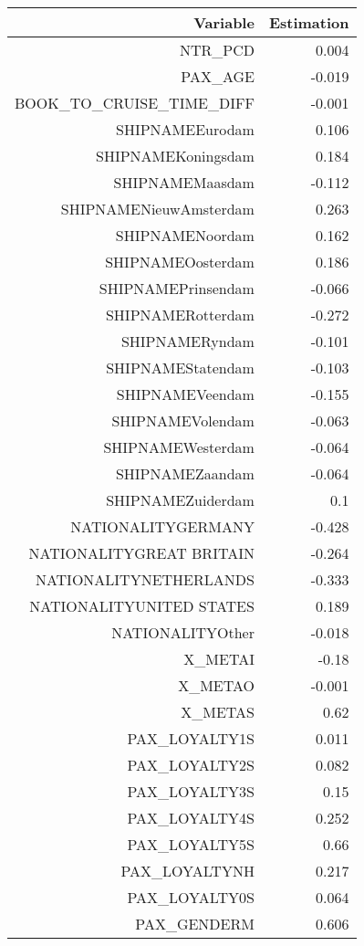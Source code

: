 \documentclass{article}
\begin{document}
\begin{table}[H]\centering
	\begin{tabular}{rr}
		Variable & Estimation \\
		\hline 
		\hline 
		NTR\_PCD & 0.004 \\
		PAX\_AGE & -0.019 \\
		BOOK\_TO\_CRUISE\_TIME\_DIFF & -0.001 \\
		SHIPNAMEEurodam & 0.106 \\
		SHIPNAMEKoningsdam & 0.184 \\
		SHIPNAMEMaasdam & -0.112 \\
		SHIPNAMENieuwAmsterdam & 0.263 \\
		SHIPNAMENoordam & 0.162 \\
		SHIPNAMEOosterdam & 0.186 \\
		SHIPNAMEPrinsendam & -0.066 \\
		SHIPNAMERotterdam & -0.272 \\
		SHIPNAMERyndam & -0.101 \\
		SHIPNAMEStatendam & -0.103 \\
		SHIPNAMEVeendam & -0.155 \\
		SHIPNAMEVolendam & -0.063 \\
		SHIPNAMEWesterdam & -0.064 \\
		SHIPNAMEZaandam & -0.064 \\
		SHIPNAMEZuiderdam & 0.1 \\
		NATIONALITYGERMANY  & -0.428 \\
		NATIONALITYGREAT BRITAIN & -0.264 \\
		NATIONALITYNETHERLANDS & -0.333 \\
		NATIONALITYUNITED STATES & 0.189 \\
		NATIONALITYOther & -0.018 \\
		X\_METAI & -0.18 \\
		X\_METAO & -0.001 \\
		X\_METAS & 0.62 \\
		PAX\_LOYALTY1S & 0.011 \\
		PAX\_LOYALTY2S & 0.082 \\
		PAX\_LOYALTY3S & 0.15 \\
		PAX\_LOYALTY4S & 0.252 \\
		PAX\_LOYALTY5S & 0.66 \\
		PAX\_LOYALTYNH & 0.217 \\
		PAX\_LOYALTY0S & 0.064 \\
		PAX\_GENDERM & 0.606 \\
		\hline 
		\hline 
	\end{tabular}
\end{table}
\end{document}
